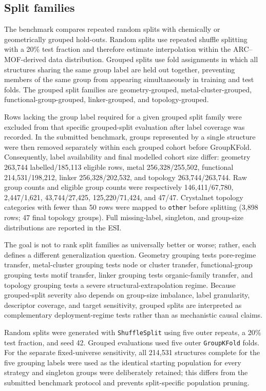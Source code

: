 \documentclass[11pt,a4paper]{article}
\begin{document}
\subsection*{Split families}
The benchmark compares repeated random splits with chemically or geometrically grouped hold-outs. Random splits use repeated shuffle splitting with a 20\% test fraction and therefore estimate interpolation within the ARC--MOF-derived data distribution. Grouped splits use fold assignments in which all structures sharing the same group label are held out together, preventing members of the same group from appearing simultaneously in training and test folds. The grouped split families are geometry-grouped, metal-cluster-grouped, functional-group-grouped, linker-grouped, and topology-grouped.

Rows lacking the group label required for a given grouped split family were excluded from that specific grouped-split evaluation after label coverage was recorded. In the submitted benchmark, groups represented by a single structure were then removed separately within each grouped cohort before GroupKFold. Consequently, label availability and final modelled cohort size differ: geometry 263,744 labelled/185,113 eligible rows, metal 256,328/255,502, functional 214,531/198,212, linker 256,328/202,532, and topology 263,744/263,744. Raw group counts and eligible group counts were respectively 146,411/67,780, 2,447/1,621, 43,744/27,425, 125,220/71,424, and 47/47. Crystalnet topology categories with fewer than 50 rows were mapped to \texttt{other} before splitting (3,898 rows; 47 final topology groups). Full missing-label, singleton, and group-size distributions are reported in the ESI.

The goal is not to rank split families as universally better or worse; rather, each defines a different generalization question. Geometry grouping tests pore-regime transfer, metal-cluster grouping tests node or cluster transfer, functional-group grouping tests motif transfer, linker grouping tests organic-family transfer, and topology grouping tests a severe structural-extrapolation regime. Because grouped-split severity also depends on group-size imbalance, label granularity, descriptor coverage, and target sensitivity, grouped splits are interpreted as complementary deployment-regime tests rather than as mechanistic causal claims.

Random splits were generated with \texttt{ShuffleSplit} using five outer repeats, a 20\% test fraction, and seed 42. Grouped evaluations used five outer \texttt{GroupKFold} folds. For the separate fixed-universe sensitivity, all 214,531 structures complete for the five grouping labels were used as the identical starting population for every strategy and singleton groups were deliberately retained; this differs from the submitted benchmark protocol and prevents split-specific population pruning.
\end{document}
